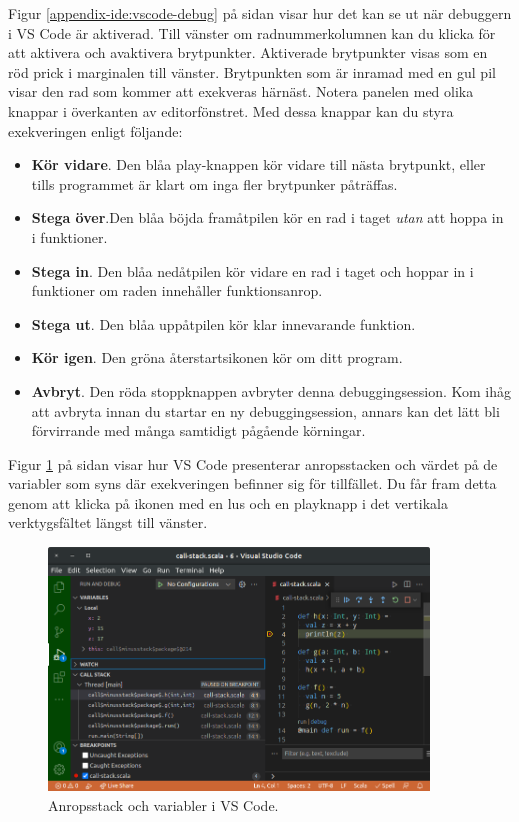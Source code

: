Figur \ref{appendix-ide:vscode-debug} på sidan \pageref{appendix-ide:vscode-debug} visar hur det kan se ut när debuggern i VS Code är aktiverad. Till vänster om radnummerkolumnen kan du klicka för att aktivera och avaktivera brytpunkter. Aktiverade brytpunkter visas som en röd prick i marginalen till vänster. Brytpunkten som är inramad med en gul pil visar den rad som kommer att exekveras härnäst. Notera panelen med olika knappar i överkanten av editorfönstret. Med dessa knappar kan du styra exekveringen enligt följande:
\begin{itemize}
  \item \textbf{Kör vidare}. Den blåa play-knappen kör vidare till nästa brytpunkt, eller tills programmet är klart om inga fler brytpunker påträffas.
  \item \textbf{Stega över}.Den blåa böjda framåtpilen kör en rad i taget \emph{utan} att hoppa in i funktioner.
  \item \textbf{Stega in}. Den blåa nedåtpilen kör vidare en rad i taget och hoppar in i funktioner om raden innehåller funktionsanrop.
  \item \textbf{Stega ut}. Den blåa uppåtpilen kör klar innevarande funktion.
  \item \textbf{Kör igen}. Den gröna återstartsikonen kör om ditt program.
  \item \textbf{Avbryt}. Den röda stoppknappen avbryter denna debuggingsession. Kom ihåg att avbryta innan du startar en ny debuggingsession, annars kan det lätt bli förvirrande med många samtidigt pågående körningar. 
\end{itemize}

Figur \ref{appendix-ide:vscode-trace} på sidan \pageref{appendix-ide:vscode-trace} visar hur VS Code presenterar anropsstacken och värdet på de variabler som syns där exekveringen befinner sig för tillfället. Du får fram detta genom att klicka på ikonen med en lus och en playknapp i det vertikala verktygsfältet längst till vänster.  

\begin{figure}
\centering
\includegraphics[width=0.9\textwidth]{../img/vscode-trace}
\caption{Anropsstack och variabler i VS Code.\label{appendix-ide:vscode-trace}}
\end{figure}


